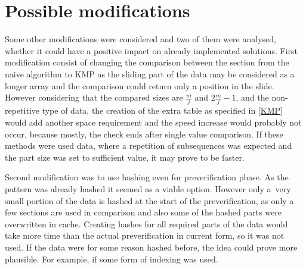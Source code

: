 \section{Possible modifications}
Some other modifications were considered and two of them were analysed, whether it could have a positive impact on already implemented solutions. First modification consist of changing the comparison between the section from the naive algorithm to KMP as the sliding part of the data may be considered as a longer array and the comparison could return only a position in the slide. However considering that the compared sizes are $\frac{m}{j}$ and $2\frac{m}{j} - 1$, and the non-repetitive type of data, the creation of the extra table as specified in \ref{KMP} would add another space requirement and the speed increase would probably not occur, because mostly, the check ends after single value comparison. If these methods were used data, where a repetition of subsequences was expected and the part size was set to sufficient value, it may prove to be faster.

Second modification was to use hashing even for preverification phase. As the pattern was already hashed it seemed as a viable option. However only a~very small portion of the data is hashed at the start of the preverification, as only a few sections are used in comparison and also some of the hashed parts were overwritten in cache. Creating hashes for all required parts of the data would take more time than the actual preverification in current form, so it was not used. If the data were for some reason hashed before, the idea could prove more plausible. For example, if some form of indexing was used.
